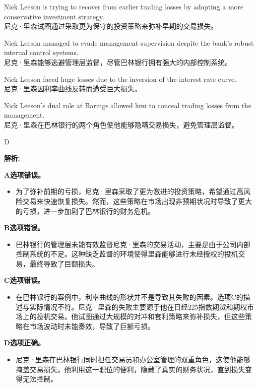 \documentclass{article}
\newenvironment{explanation}
{\textbf{解析:}\par}
{\par}
\begin{document}
\begin{choices}
    \item Nick Leeson is trying to recover from earlier trading losses by adopting a more conservative investment strategy.\\
    尼克·里森试图通过采取更为保守的投资策略来弥补早期的交易损失。
    \item Nick Leeson managed to evade management supervision despite the bank's robust internal control systems.\\
    尼克·里森能够逃避管理层监督，尽管巴林银行拥有强大的内部控制系统。
    \item Nick Leeson faced huge losses due to the inversion of the interest rate curve.\\
    尼克·里森因利率曲线反转而遭受巨大损失。
    \item Nick Leeson's dual role at Barings allowed him to conceal trading losses from the management.\\
    尼克·里森在巴林银行的两个角色使他能够隐瞒交易损失，避免管理层监督。
\end{choices}

\begin{correctanswer}
    D
\end{correctanswer}

\begin{explanation}
    \textbf{A选项错误。}
    \begin{itemize}
        \item 为了弥补前期的亏损，尼克·里森采取了更为激进的投资策略，希望通过高风险交易来快速恢复损失。然而，这些策略在市场出现非预期状况时导致了更大的亏损，进一步加剧了巴林银行的财务危机。
    \end{itemize}

    \textbf{B选项错误。}
    \begin{itemize}
        \item 巴林银行的管理层未能有效监督尼克·里森的交易活动，主要是由于公司内部控制系统的不足。这种缺乏监督的环境使得里森能够进行未经授权的投机交易，最终导致了巨额损失。
    \end{itemize}

    \textbf{C选项错误。}
    \begin{itemize}
        \item 在巴林银行的案例中，利率曲线的形状并不是导致其失败的因素。选项C的描述与实际情况不符。尼克·里森的失败主要源于他在日经225指数期货和期权市场上的投机交易。他试图通过大规模的对冲和套利策略来弥补损失，但这些策略在市场波动时未能奏效，导致了巨额亏损。
    \end{itemize}

    \textbf{D选项正确。}
    \begin{itemize}
        \item 尼克·里森在巴林银行同时担任交易员和办公室管理的双重角色，这使他能够掩盖交易损失。他利用这一职位的便利，隐藏了真实的财务状况，直到损失变得无法控制。
    \end{itemize}
\end{explanation}
\end{document}
